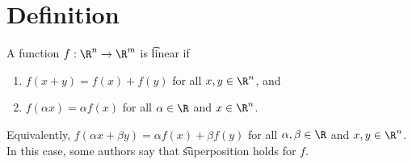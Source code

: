 
\section*{Definition}

A function $f: \R ^n \to \R ^m$ is \t{linear} if
    \begin{enumerate}
      \item $f(x + y) = f(x) + f(y)$ for all $x, y \in \R ^n$, and
      \item $f(\alpha x) = \alpha f(x)$ for all $\alpha  \in \R $ and $x \in \R ^n$.
    \end{enumerate}
Equivalently, $f(\alpha x + \beta y) = \alpha f(x) + \beta f(y)$ for all $\alpha , \beta  \in \R $ and $x, y \in \R ^n$.
In this case, some authors say that \t{superposition} holds for $f$.


\blankpage